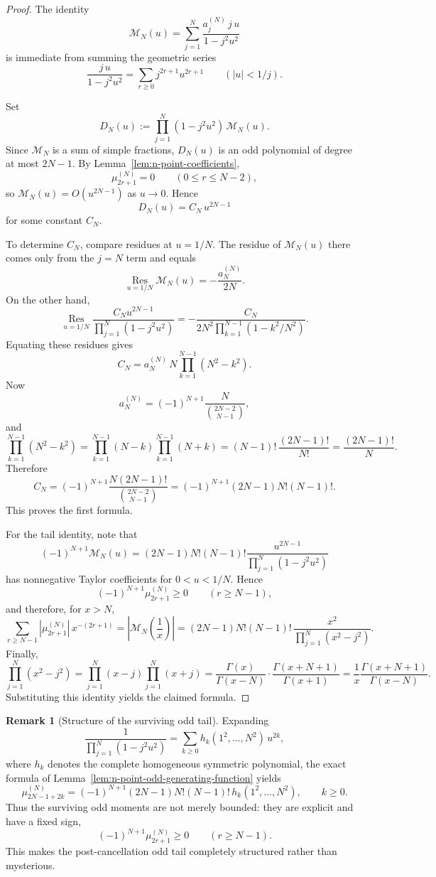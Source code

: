 \documentclass[11pt,a4paper]{amsart}
\theoremstyle{plain}
\theoremstyle{definition}
\newtheorem{remark}[theorem]{Remark}
\begin{document}
\begin{proof}
The identity
\[
\mathcal M_N(u)
=
\sum_{j=1}^N \frac{a_j^{(N)}\,j\,u}{1-j^2u^2}
\]
is immediate from summing the geometric series
\[
\frac{j\,u}{1-j^2u^2}
=
\sum_{r\ge 0} j^{2r+1}u^{2r+1}
\qquad (|u|<1/j).
\]

Set
\[
D_N(u):=
\prod_{j=1}^N(1-j^2u^2)\,\mathcal M_N(u).
\]
Since $\mathcal M_N$ is a sum of simple fractions, $D_N(u)$ is an odd
polynomial of degree at most $2N-1$. By
Lemma~\ref{lem:n-point-coefficients},
\[
\mu_{2r+1}^{(N)}=0
\qquad (0\le r\le N-2),
\]
so $\mathcal M_N(u)=O(u^{2N-1})$ as $u\to 0$. Hence
\[
D_N(u)=C_N\,u^{2N-1}
\]
for some constant $C_N$.

To determine $C_N$, compare residues at $u=1/N$. The residue of
$\mathcal M_N(u)$ there comes only from the $j=N$ term and equals
\[
\operatorname*{Res}_{u=1/N}\mathcal M_N(u)
=
-\frac{a_N^{(N)}}{2N}.
\]
On the other hand,
\[
\operatorname*{Res}_{u=1/N}
\frac{C_Nu^{2N-1}}{\prod_{j=1}^N(1-j^2u^2)}
=
-\frac{C_N}{2N^2\prod_{k=1}^{N-1}(1-k^2/N^2)}.
\]
Equating these residues gives
\[
C_N
=
a_N^{(N)}\,N\prod_{k=1}^{N-1}(N^2-k^2).
\]
Now
\[
a_N^{(N)}
=
(-1)^{N+1}\frac{N}{\binom{2N-2}{N-1}},
\]
and
\[
\prod_{k=1}^{N-1}(N^2-k^2)
=
\prod_{k=1}^{N-1}(N-k)\prod_{k=1}^{N-1}(N+k)
=
(N-1)!\,\frac{(2N-1)!}{N!}
=
\frac{(2N-1)!}{N}.
\]
Therefore
\[
C_N
=
(-1)^{N+1}\frac{N(2N-1)!}{\binom{2N-2}{N-1}}
=
(-1)^{N+1}(2N-1)N!(N-1)!.
\]
This proves the first formula.

For the tail identity, note that
\[
(-1)^{N+1}\mathcal M_N(u)
=
(2N-1)N!(N-1)!
\frac{u^{2N-1}}{\prod_{j=1}^N(1-j^2u^2)}
\]
has nonnegative Taylor coefficients for $0<u<1/N$. Hence
\[
(-1)^{N+1}\mu_{2r+1}^{(N)}\ge 0
\qquad (r\ge N-1),
\]
and therefore, for $x>N$,
\[
\sum_{r\ge N-1} |\mu_{2r+1}^{(N)}|\,x^{-(2r+1)}
=
\left|\mathcal M_N\!\left(\frac1x\right)\right|
=
(2N-1)N!(N-1)!\,
\frac{x^2}{\prod_{j=1}^N(x^2-j^2)}.
\]
Finally,
\[
\prod_{j=1}^N(x^2-j^2)
=
\prod_{j=1}^N(x-j)\prod_{j=1}^N(x+j)
=
\frac{\Gamma(x)}{\Gamma(x-N)}\cdot
\frac{\Gamma(x+N+1)}{\Gamma(x+1)}
=
\frac{1}{x}\frac{\Gamma(x+N+1)}{\Gamma(x-N)}.
\]
Substituting this identity yields the claimed formula.
\end{proof}

\begin{remark}[Structure of the surviving odd tail]
\label{rem:surviving-odd-tail-structure}
Expanding
\[
\frac{1}{\prod_{j=1}^N(1-j^2u^2)}
=
\sum_{k\ge 0} h_k(1^2,\dots,N^2)\,u^{2k},
\]
where $h_k$ denotes the complete homogeneous symmetric polynomial, the exact
formula of Lemma~\ref{lem:n-point-odd-generating-function} yields
\[
\mu_{2N-1+2k}^{(N)}
=
(-1)^{N+1}(2N-1)N!(N-1)!\,
h_k(1^2,\dots,N^2),
\qquad k\ge 0.
\]
Thus the surviving odd moments are not merely bounded: they are explicit and
have a fixed sign,
\[
(-1)^{N+1}\mu_{2r+1}^{(N)}\ge 0
\qquad (r\ge N-1).
\]
This makes the post-cancellation odd tail completely structured rather than
mysterious.
\end{remark}
\end{document}
